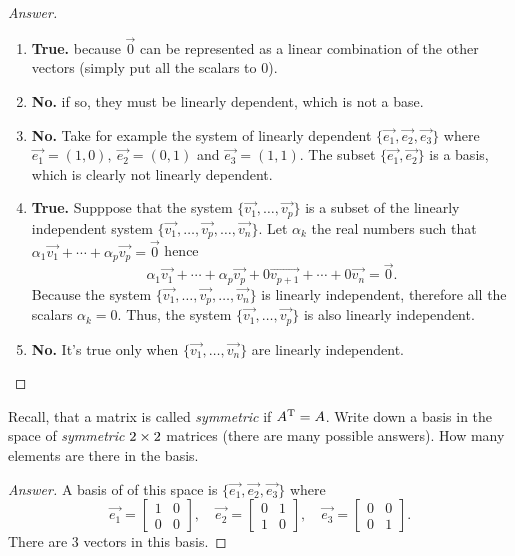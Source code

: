 \begin{proof}[Answer]
  \text{}
  \begin{enumerate}[label={\alph*)}]
    \item \textbf{True.} because $\vec{0}$ can be represented as a linear 
      combination of the other vectors (simply put all the scalars to $0$).
    \item \textbf{No.} if so, they must be linearly dependent, which is not a base.
    \item \textbf{No.} Take for example the system of linearly dependent
      $\{\vec{e_1},\vec{e_2},\vec{e_3}\}$ where 
      $\vec{e_1}=(1,0),~\vec{e_2}=(0,1)$ and $\vec{e_3}=(1,1)$.
      The subset $\{\vec{e_1},\vec{e_2}\}$ is a basis, which is 
      clearly not linearly dependent.
    \item \textbf{True.} Supppose that the system 
      $\{\vec{v_1},\dots,\vec{v_p}\}$
      is a subset of the linearly independent system 
      $\{\vec{v_1},\dots,\vec{v_p},\dots,\vec{v_n}\}$. Let $\alpha_k$ the 
      real numbers such that
      $\alpha_{1}\vec{v_1}+\cdots+\alpha_{p}\vec{v_p}=\vec{0}$
      hence
      \[
        \alpha_{1}\vec{v_1}+\cdots+\alpha_{p}\vec{v_p}+
        0\vec{v_{p+1}}+\cdots+0\vec{v_n}=\vec{0}.
      \]
      Because the system $\{\vec{v_1},\dots,\vec{v_p},\dots,\vec{v_n}\}$
      is linearly independent, therefore all the scalars $\alpha_k=0$. 
      Thus, the system $\{\vec{v_1},\dots,\vec{v_p}\}$ is also linearly
      independent.
    \item \textbf{No.} It's true only when $\{\vec{v_1},\dots,\vec{v_n}\}$
      are linearly independent.
  \end{enumerate}
\end{proof}
\begin{exercise}
  Recall, that a matrix is called \emph{symmetric} if 
  $A^\mathrm{T}=A$. Write down a basis in the space of \emph{symmetric}
  $2\times 2$ matrices (there are many possible answers). How many
  elements are there in the basis.
\end{exercise}
\begin{proof}[Answer]
  A basis of of this space is $\{\vec{e_1},\vec{e_2},\vec{e_3}\}$ where
  \[
    \vec{e_1}= \begin{bmatrix} 1&0\\0&0 \end{bmatrix},\quad
    \vec{e_2}= \begin{bmatrix} 0&1\\1&0 \end{bmatrix},\quad
    \vec{e_3}= \begin{bmatrix} 0&0\\0&1 \end{bmatrix}.
  \]
  There are 3 vectors in this basis.
\end{proof}
